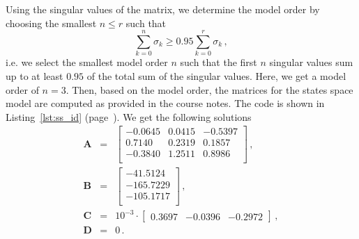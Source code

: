 Using the singular values of the matrix, we determine the model order by choosing the smallest $n \le r$ such that
\begin{equation}
	\sum\limits_{k=0}^{n}\sigma_k \ge 0.95\sum\limits_{k=0}^{r}\sigma_k\, ,
\end{equation}
i.e. we select the smallest model order $n$ such that the first $n$ singular values sum up to at least $0.95$ of the total sum of the singular values.
Here, we get a model order of $n = 3$.
Then, based on the model order, the matrices for the states space model are computed as provided in the course notes.
The code is shown in Listing~\ref{lst:ss_id} (page~\pageref{lst:ss_id}).
We get the following solutions
\begin{eqnarray}
	\mathbf{A} &=& \begin{bmatrix}
			-0.0645  & 0.0415 & -0.5397\\
			 0.7140  & 0.2319 &  0.1857\\
			-0.3840  & 1.2511 &  0.8986\\
	\end{bmatrix}\,,\\
	\mathbf{B} &=& \begin{bmatrix}
		 -41.5124\\
		-165.7229\\
		-105.1717\\
	\end{bmatrix}\,,\\
	\mathbf{C} &=& 10^{-3} \cdot \begin{bmatrix}
	    0.3697 & -0.0396 & -0.2972
	\end{bmatrix}\, ,\\
	\mathbf{D} &=& 0\, .
\end{eqnarray}

